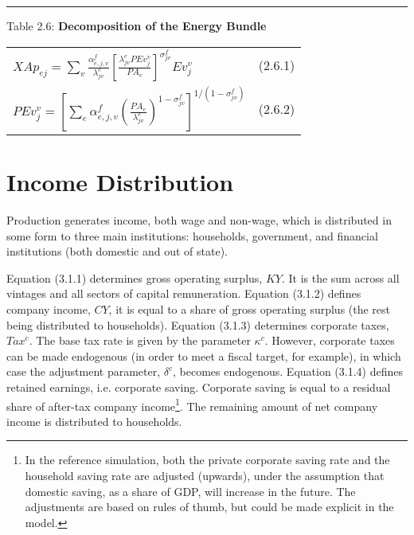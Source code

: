 \documentclass{article}
\begin{document}
\noindent\rule{\linewidth}{0.4pt}
\begin{center}
\begin{large}

{\centering Table 2.6: \textbf{Decomposition of the Energy Bundle} \par}

\begin{tabular}{>{\raggedright}p{} l}

$X\!Ap_{ej} = \displaystyle \sum_v \frac {\alpha^f_{e,j,v}} {\lambda^e_{jv}} \left[\frac {\lambda^e_{jv} PEv^v_j} {PA_e} \right]^{\sigma^f_{jv}} Ev^v_j$ & (2.6.1)\\[20pt]

$PEv^v_j = \left[\displaystyle \sum_e \alpha^f_{e,j,v} \left(\frac {P\!A_e} {\lambda^e_{jv}} \right)^{1-{\sigma^f_{jv}}} \right]^{1/(1-{\sigma^f_{jv}})}$ & (2.6.2)\\[15pt]

\hline
\end{tabular}
\end{large}
\end{center}

\section{Income Distribution}

Production generates income, both wage and non-wage, which is distributed in some form to three main institutions:  households, government, and financial institutions (both domestic and out of state).

Equation (3.1.1) determines gross operating surplus, $KY$. It is the sum across all vintages and all sectors of capital remuneration. Equation (3.1.2) defines company income, $CY$, it is equal to a share of gross operating surplus (the rest being distributed to households). Equation (3.1.3) determines corporate taxes, $Tax^c$. The base tax rate is given by the parameter $\kappa^c$. However, corporate taxes can be made endogenous (in order to meet a fiscal target, for example), in which case the adjustment parameter, $\delta^c$, becomes endogenous. Equation (3.1.4) defines retained earnings, i.e. corporate saving. Corporate saving is equal to a residual share of after-tax company income\footnote{In the reference simulation, both the private corporate saving rate and the household saving rate are adjusted (upwards), under the assumption that domestic saving, as a share of GDP, will increase in the future. The adjustments are based on rules of thumb, but could be made explicit in the model.}. The remaining amount of net company income is distributed to households.
\end{document}

